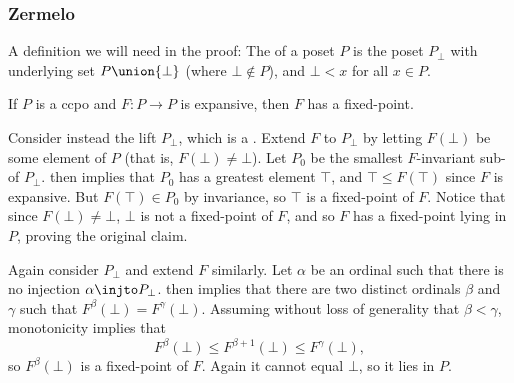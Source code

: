\subsubsection{Zermelo}

A definition we will need in the proof: The  of a poset $P$ is the poset $P_\bot$ with underlying set $P \union \{\bot\}$ (where $\bot \not\in P$), and $\bot < x$ for all $x \in P$.

\begin{theorem}
    \label{thm:Zermelo}
    If $P$ is a ccpo and $F \colon P \to P$ is expansive, then $F$ has a fixed-point.
\end{theorem}

\begin{proofof}
    Consider instead the lift $P_\bot$, which is a \cCPPO. Extend $F$ to $P_\bot$ by letting $F(\bot)$ be some element of $P$ (that is, $F(\bot) \neq \bot$). Let $P_0$ be the smallest $F$-invariant sub-\cCPPO{} of $P_\bot$.  then implies that $P_0$ has a greatest element $\top$, and $\top \leq F(\top)$ since $F$ is expansive. But $F(\top) \in P_0$ by invariance, so $\top$ is a fixed-point of $F$. Notice that since $F(\bot) \neq \bot$, $\bot$ is not a fixed-point of $F$, and so $F$ has a fixed-point lying in $P$, proving the original claim.
\end{proofof}

\begin{proofof}
    Again consider $P_\bot$ and extend $F$ similarly. Let $\alpha$ be an ordinal such that there is no injection $\alpha \injto P_\bot$.  then implies that there are two distinct ordinals $\beta$ and $\gamma$ such that $F^\beta(\bot) = F^\gamma(\bot)$. Assuming without loss of generality that $\beta < \gamma$, monotonicity implies that
    \begin{equation*}
        F^\beta(\bot)
            \leq F^{\beta + 1}(\bot)
            \leq F^\gamma(\bot),
    \end{equation*}
    so $F^\beta(\bot)$ is a fixed-point of $F$. Again it cannot equal $\bot$, so it lies in $P$.
\end{proofof}


